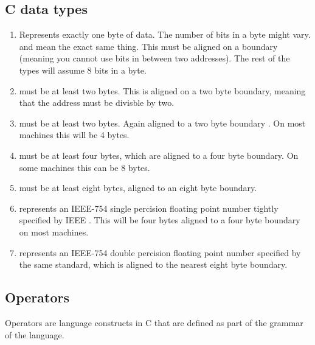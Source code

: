 \subsection{C data types}

\begin{enumerate}
	\item {} Represents exactly one byte of data. The number of bits in a byte might vary.  and  mean the exact same thing. This must be aligned on a boundary (meaning you cannot use bits in between two addresses). The rest of the types will assume 8 bits in a byte.
	\item {} must be at least two bytes. This is aligned on a two byte boundary, meaning that the address must be divisble by two.
	\item {} must be at least two bytes. Again aligned to a two byte boundary \cite[P. 34]{ISON1124}. On most machines this will be 4 bytes.
	\item {} must be at least four bytes, which are aligned to a four byte boundary. On some machines this can be 8 bytes.
	\item {} must be at least eight bytes, aligned to an eight byte boundary.
	\item {} represents an IEEE-754 single percision floating point number tightly specified by IEEE \cite{4610935}. This will be four bytes aligned to a four byte boundary on most machines.
	\item {} represents an IEEE-754 double percision floating point number specified by the same standard, which is aligned to the nearest eight byte boundary.
\end{enumerate}

\subsection{Operators}

Operators are language constructs in C that are defined as part of the grammar of the language.

